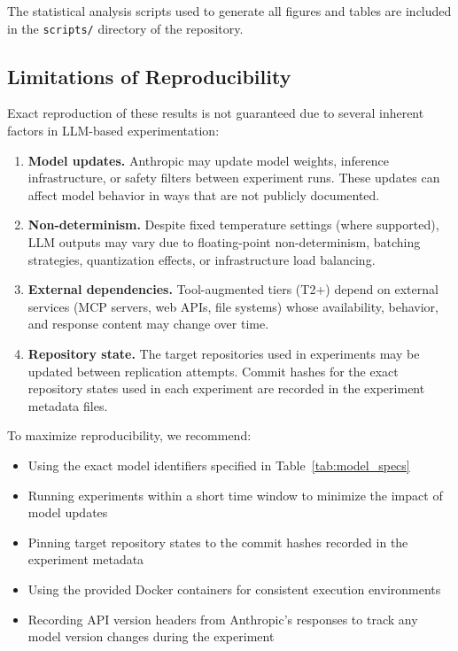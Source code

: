 \documentclass[11pt]{article}
\begin{document}
The statistical analysis scripts used to generate all figures and tables are
included in the \texttt{scripts/} directory of the repository.

\subsection{Limitations of Reproducibility}

Exact reproduction of these results is not guaranteed due to several inherent
factors in LLM-based experimentation:

\begin{enumerate}
  \item \textbf{Model updates.} Anthropic may update model weights, inference
    infrastructure, or safety filters between experiment runs. These updates
    can affect model behavior in ways that are not publicly documented.
  \item \textbf{Non-determinism.} Despite fixed temperature settings (where
    supported), LLM outputs may vary due to floating-point non-determinism,
    batching strategies, quantization effects, or infrastructure load
    balancing.
  \item \textbf{External dependencies.} Tool-augmented tiers (T2+) depend on
    external services (MCP servers, web APIs, file systems) whose availability,
    behavior, and response content may change over time.
  \item \textbf{Repository state.} The target repositories used in experiments
    may be updated between replication attempts. Commit hashes for the exact
    repository states used in each experiment are recorded in the experiment
    metadata files.
\end{enumerate}

To maximize reproducibility, we recommend:
\begin{itemize}
  \item Using the exact model identifiers specified in
    Table~\ref{tab:model_specs}
  \item Running experiments within a short time window to minimize the impact
    of model updates
  \item Pinning target repository states to the commit hashes recorded in
    the experiment metadata
  \item Using the provided Docker containers for consistent execution
    environments
  \item Recording API version headers from Anthropic's responses to track
    any model version changes during the experiment
\end{itemize}
\end{document}

